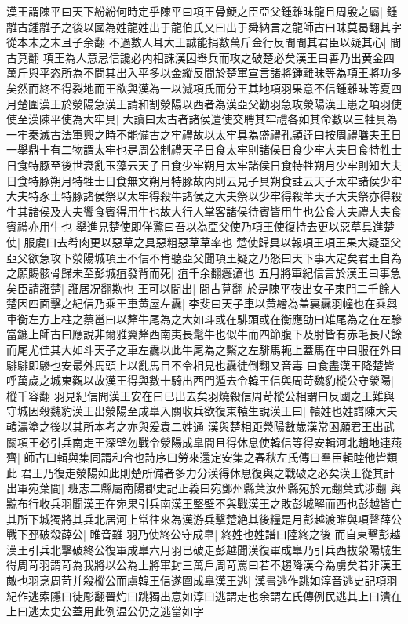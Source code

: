 漢王謂陳平曰天下紛紛何時定乎陳平曰項王骨鯁之臣亞父鍾離昩龍且周殷之屬|{
	鍾離古鍾離子之後以國為姓龍姓出于龍伯氏又曰出于舜納言之龍師古曰昧莫曷翻其字從本末之末且子余翻}
不過數人耳大王誠能捐數萬斤金行反間間其君臣以疑其心|{
	間古莧翻}
項王為人意忌信讒必内相誅漢因舉兵而攻之破楚必矣漢王曰善乃出黄金四萬斤與平恣所為不問其出入平多以金縱反間於楚軍宣言諸將鍾離昧等為項王將功多矣然而終不得裂地而王欲與漢為一以滅項氏而分王其地項羽果意不信鍾離昧等夏四月楚圍漢王於滎陽急漢王請和割滎陽以西者為漢亞父勸羽急攻滎陽漢王患之項羽使使至漢陳平使為大牢具|{
	大讀曰太古者諸侯遣使交聘其牢禮各如其命數以三牲具為一牢秦滅古法軍興之時不能備古之牢禮故以太牢具為盛禮孔頴逹曰按周禮膳夫王日一舉鼎十有二物謂太牢也是周公制禮天子日食太牢則諸侯日食少牢大夫日食特牲士日食特豚至後世衰亂玉藻云天子日食少牢朔月太牢諸侯日食特牲朔月少牢則知大夫日食特豚朔月特牲士日食無文朔月特豚故内則云見子具朔食註云天子太牢諸侯少牢大夫特豕士特豚諸侯祭以太牢得殺牛諸侯之大夫祭以少牢得殺羊天子大夫祭亦得殺牛其諸侯及大夫饗食賓得用牛也故大行人掌客諸侯待賓皆用牛也公食大夫禮大夫食賓禮亦用牛也}
舉進見楚使即佯驚曰吾以為亞父使乃項王使復持去更以惡草具進楚使|{
	服䖍曰去肴肉更以惡草之具惡粗惡草草率也}
楚使歸具以報項王項王果大疑亞父亞父欲急攻下滎陽城項王不信不肯聽亞父聞項王疑之乃怒曰天下事大定矣君王自為之願賜骸骨歸未至彭城疽發背而死|{
	疽千余翻癰瘡也}
五月將軍紀信言於漢王曰事急矣臣請誑楚|{
	誑居况翻欺也}
王可以間出|{
	間古莧翻}
於是陳平夜出女子東門二千餘人楚因四面擊之紀信乃乘王車黄屋左纛|{
	李斐曰天子車以黄繒為盖裏纛羽幢也在乘輿車衡左方上柱之蔡邕曰以犛牛尾為之大如斗或在騑頭或在衡應劭曰雉尾為之在左驂當鑣上師古曰應說非爾雅翼犛西南夷長髦牛也似牛而四節腹下及肘皆有赤毛長尺餘而尾尤佳其大如斗天子之車左纛以此牛尾為之繫之左騑馬軛上蓋馬在中曰服在外曰騑騑即驂也安最外馬頭上以亂馬目不令相見也纛徒倒翻又音毒}
曰食盡漢王降楚皆呼萬歲之城東觀以故漢王得與數十騎出西門遁去令韓王信與周苛魏豹樅公守滎陽|{
	樅千容翻}
羽見紀信問漢王安在曰已出去矣羽燒殺信周苛樅公相謂曰反國之王難與守城因殺魏豹漢王出滎陽至成臯入關收兵欲復東轅生說漢王曰|{
	轅姓也姓譜陳大夫轅濤塗之後以其所本考之亦與爰袁二姓通}
漢與楚相距滎陽數歲漢常困願君王出武關項王必引兵南走王深壁勿戰令滎陽成臯間且得休息使韓信等得安輯河北趙地連燕齊|{
	師古曰輯與集同謂和合也詩序曰勞來還定安集之春秋左氏傳曰羣臣輯睦他皆類此}
君王乃復走滎陽如此則楚所備者多力分漢得休息復與之戰破之必矣漢王從其計出軍宛葉間|{
	班志二縣屬南陽郡史記正義曰宛鄧州縣葉汝州縣宛於元翻葉式涉翻}
與黥布行收兵羽聞漢王在宛果引兵南漢王堅壁不與戰漢王之敗彭城解而西也彭越皆亡其所下城獨將其兵北居河上常往來為漢游兵擊楚絶其後糧是月彭越渡睢與項聲薛公戰下邳破殺薛公|{
	睢音雖}
羽乃使終公守成臯|{
	終姓也姓譜曰陸終之後}
而自東擊彭越漢王引兵北擊破終公復軍成臯六月羽已破走彭越聞漢復軍成臯乃引兵西拔滎陽城生得周苛羽謂苛為我將以公為上將軍封三萬戶周苛罵曰若不趨降漢今為虜矣若非漢王敵也羽烹周苛并殺樅公而虜韓王信遂圍成臯漢王逃|{
	漢書逃作跳如淳音逃史記項羽紀作逃索隱曰徒彫翻晉灼曰跳獨出意如淳曰逃謂走也余謂左氏傳例民逃其上曰潰在上曰逃太史公蓋用此例温公仍之逃當如字}
